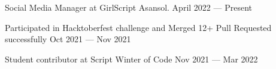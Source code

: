Social Media Manager at GirlScript Asansol.	\hfill April 2022 — Present
 
Participated in Hacktoberfest challenge and Merged 12+ Pull Requested successfully \hfill Oct 2021  —  Nov 2021

Student contributor at Script Winter of Code \hfill Nov 2021 — Mar 2022



